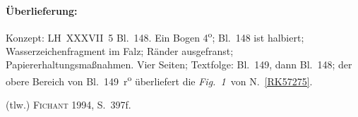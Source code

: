 %  
%
%
%
%
%
\frenchspacing
%
\begin{ledgroupsized}[r]{120mm}
\footnotesize
\pstart
\noindent\textbf{Überlieferung:}
\pend
\end{ledgroupsized}
%
\begin{ledgroupsized}[r]{114mm}
\footnotesize
\pstart \parindent -6mm 
Konzept: 
LH~XXXVII~5 Bl.~148. 
Ein Bogen 4\textsuperscript{o};
Bl.~148 ist halbiert;
Wasserzeichenfragment im Falz;
Ränder ausgefranst; Papiererhaltungsmaßnahmen.
Vier Seiten;
Textfolge: Bl.~149, dann Bl.~148;
der obere Bereich von Bl.~149~r\textsuperscript{o} überliefert die \lbrack\textit{Fig.~1}\rbrack\ von N.~\ref{RK57275}.
\pend
\end{ledgroupsized}
%
\begin{ledgroupsized}[r]{114mm}
\footnotesize
\pstart
\parindent -6mm 
(tlw.) \cite{01056}\textsc{Fichant} 1994, S.~397f.
\pend
\end{ledgroupsized}
%
%
\vspace{5mm}

